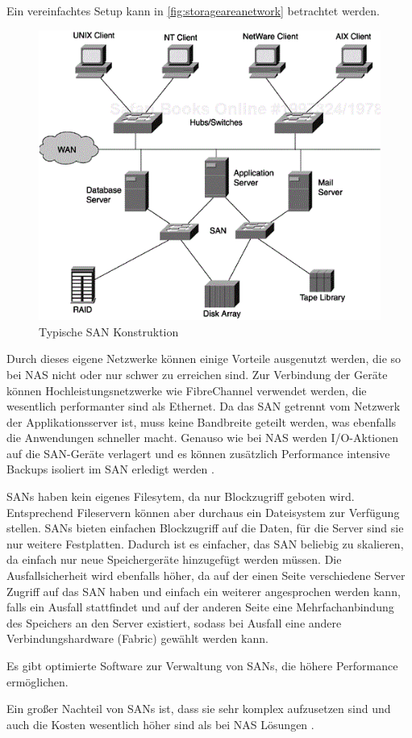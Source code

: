 Ein vereinfachtes Setup kann in \autoref{fig:storageareanetwork} betrachtet werden.

\begin{figure}[hbt]
	\centering
	\includegraphics[scale=0.9]{images/storage-area-network}
	\caption{Typische SAN Konstruktion \parencite[Kap. 1]{gupta.2002}}
	\label{fig:storageareanetwork}
\end{figure}

Durch dieses eigene Netzwerke können einige Vorteile ausgenutzt werden, die so bei \ac{NAS} nicht oder nur schwer zu erreichen sind. Zur Verbindung der Geräte können Hochleistungsnetzwerke wie FibreChannel verwendet werden, die wesentlich performanter sind als Ethernet. Da das SAN getrennt vom Netzwerk der Applikationsserver ist, muss keine Bandbreite geteilt werden, was ebenfalls die Anwendungen schneller macht. Genauso wie bei NAS werden I/O-Aktionen auf die SAN-Geräte verlagert und es können zusätzlich Performance intensive Backups isoliert im SAN erledigt werden \parencite[Kap. 1, SANs]{gupta.2002}.

SANs haben kein eigenes Filesytem, da nur Blockzugriff geboten wird. Entsprechend Fileservern können aber durchaus ein Dateisystem zur Verfügung stellen. SANs bieten einfachen Blockzugriff auf die Daten, für die Server sind sie nur weitere Festplatten. Dadurch ist es einfacher, das SAN beliebig zu skalieren, da einfach nur neue Speichergeräte hinzugefügt werden müssen. Die Ausfallsicherheit wird ebenfalls höher, da auf der einen Seite verschiedene Server Zugriff auf das SAN haben und einfach ein weiterer angesprochen werden kann, falls ein Ausfall stattfindet und auf der anderen Seite eine Mehrfachanbindung des Speichers an den Server existiert, sodass bei Ausfall eine andere Verbindungshardware (Fabric) gewählt werden kann. 

Es gibt optimierte Software zur Verwaltung von SANs, die höhere Performance ermöglichen.

Ein großer Nachteil von SANs ist, dass sie sehr komplex aufzusetzen sind und auch die Kosten wesentlich höher sind als bei NAS Lösungen \parencite[Kap. 2]{gupta.2002}.